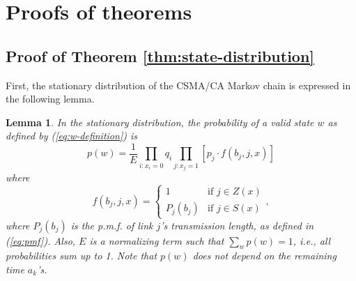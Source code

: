 \documentclass{IEEEtran}
\newtheorem{lemma}{Lemma}
\begin{document}
\appendix

\section{\label{sec:Proofs-of-theorems}Proofs of theorems}


\subsection{\label{sub:Proof-product-form}Proof of Theorem \ref{thm:state-distribution}}

First, the stationary distribution of the CSMA/CA Markov chain is
expressed in the following lemma. 
\begin{lemma}
\label{thm:extended-state-distribution}In the stationary distribution,
the probability of a valid state $w$ as defined by (\ref{eq:w-definition})
is\begin{equation}
p(w)=\frac{1}{E}\prod_{i:x_{i}=0}q_{i}\prod_{j:x_{j}=1}[p_{j}\cdot f(b_{j},j,x)]\label{eq:w}\end{equation}
where \begin{equation}
f(b_{j},j,x)=\begin{cases}
1 & \text{if }j\in Z(x)\\
P_{j}(b_{j}) & \text{if }j\in S(x)\end{cases},\label{eq:f_def}\end{equation}
where $P_{j}(b_{j})$ is the p.m.f. of link $j$'s transmission length,
as defined in (\ref{eq:pmf}). Also, $E$ is a normalizing term such
that $\sum_{w}p(w)=1$, i.e., all probabilities sum up to 1. Note
that $p(w)$ does not depend on the remaining time $a_{k}$'s.\end{lemma}
\end{document}
